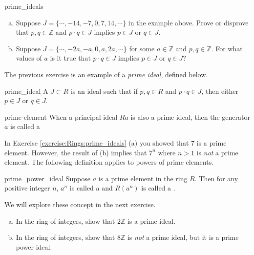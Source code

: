 \begin{exercise}{prime_ideals}
\begin{enumerate}[(a)]
\item Suppose $J=\{\cdots,-14,-7,0,7,14,\cdots\}$ in the example above.  Prove or disprove that $p,q\in{\mathbb Z}$ and $p\cdot q\in J$ implies $p\in J$ or $q\in J$.
\item Suppose $J=\{\cdots,-2a,-a,0,a,2a,\cdots\}$ for some $a\in{\mathbb Z}$ and $p,q\in{\mathbb Z}$.  For what values of $a$ is it true that $p\cdot q\in J$ implies $p\in J$ or $q\in J$? 
\end{enumerate}
\end{exercise}

The previous exercise is an example of a \emph{prime ideal}, defined below. 

\begin{defn}{prime_ideal}
A  $J\subset R$ is an ideal such that if $p,q\in R$ and $p\cdot q\in J$, then either $p\in J$ or $q\in J$.
\end{defn}

\begin{defn}{prime element}
When a principal ideal $Ra$ is also a prime ideal, then the generator $a$ is called a 
\end{defn}

In Exercise \ref{exercise:Rings:prime_ideals} (a) you showed that $7$ is a prime element.  However, the result of (b) implies that $7^n$ where $n>1$ is \emph{not} a prime element.  The following definition applies to powers of prime elements.

\begin{defn}{prime_power_ideal}
Suppose $a$ is a prime element in the ring $R$.  Then for any positive integer $n$, $a^n$ is called a  and $R(a^n)$ is called a .
\end{defn}

We will explore these concept in the next exercise.

\begin{exercise}{}
\begin{enumerate}[(a)]
\item In the ring of integers, show that $2{\mathbb Z}$ is a prime ideal.
\item In the ring of integers, show that $8{\mathbb Z}$ is \emph{not} a prime ideal, but it is a prime power ideal.
\end{enumerate}
\end{exercise}

